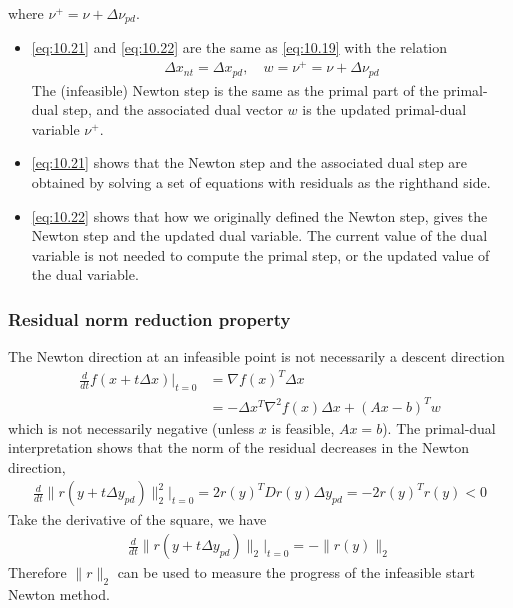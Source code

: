 where $\nu^{+}=\nu+\Delta\nu_{pd}$.
\begin{itemize}
  \item \eqref{eq:10.21} and \eqref{eq:10.22} are the same as \eqref{eq:10.19} with the relation
        \begin{align*}
          \Delta x_{nt}=\Delta x_{pd},\quad w=\nu^+=\nu+\Delta\nu_{pd}
        \end{align*}
        The (infeasible) Newton step is the same as the primal part of the primal-dual step, and the associated dual vector $w$ is the updated primal-dual variable $\nu^+$.
  \item \eqref{eq:10.21} shows that the Newton step and the associated dual step are obtained by solving a set of equations with residuals as the righthand side.
  \item \eqref{eq:10.22} shows that how we originally defined the Newton step, gives the Newton step and the updated dual variable. The current value of the dual variable is not needed to compute the primal step, or the updated value of the dual variable.
\end{itemize}

\subsubsection{Residual norm reduction property}
The Newton direction at an infeasible point is not necessarily a descent direction
\begin{align*}
  \frac{d}{dt}f(x+t\Delta x)\bigg|_{t=0}
    &= \nabla f(x)^T\Delta x\\
    &= -\Delta x^T\nabla^2f(x)\Delta x+(Ax-b)^Tw
\end{align*}
which is not necessarily negative (unless $x$ is feasible, \ie $Ax=b$).
The primal-dual interpretation shows that the norm of the residual decreases in the Newton direction, \ie
\begin{align*}
  \frac{d}{dt}\|r(y+t\Delta y_{pd})\|_2^2\bigg|_{t=0}=2r(y)^TDr(y)\Delta y_{pd}=-2r(y)^Tr(y)<0
\end{align*}
Take the derivative of the square, we have
\begin{align}
  \frac{d}{dt}\|r(y+t\Delta y_{pd})\|_2\bigg|_{t=0}=-\|r(y)\|_2\label{eq:10.23}
\end{align}
Therefore $\|r\|_2$ can be used to measure the progress of the infeasible start Newton method.

